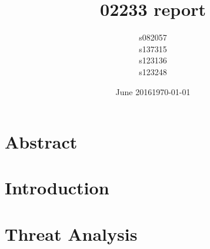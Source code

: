 \documentclass[11pt]{article}
\title{02233 report}
\author{s082057\\s137315\\s123136\\s123248}
\date{June 2016}
\date{\today}
\begin{document}


\tableofcontents

\section{Abstract}


\section{Introduction}


\section{Threat Analysis}


{}

\end{document}
